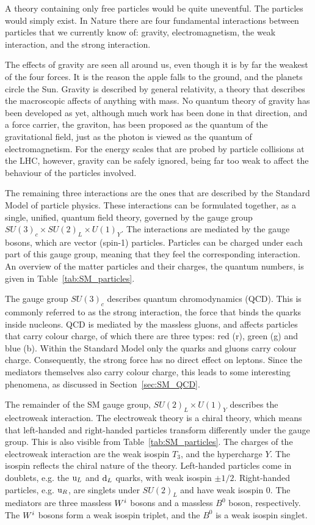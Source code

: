 A theory containing only free particles would be quite uneventful. The particles would simply
exist.
In Nature there are four fundamental interactions between particles that we currently know of:
gravity, electromagnetism, the weak interaction, and the strong interaction. 

The effects of gravity are seen all around us, even though it is by far the weakest of the four
forces. It is the reason the apple falls to the ground, and the planets circle the Sun. 
Gravity is described by general relativity, a theory that describes the macroscopic affects of
anything with mass. No quantum theory of gravity has been developed as yet, although much work
has been done in that direction, and a force carrier, the graviton, has been proposed as the quantum
of the gravitational field, just as the photon is viewed as the quantum of electromagnetism.
For the energy scales that are probed by particle collisions at the LHC, however, gravity can be
safely ignored, being far too weak to affect the behaviour of the particles involved. 

The remaining three interactions are the ones that are described by the Standard Model of
particle physics. These interactions can be formulated together, as a single, unified, quantum field
theory,
governed by the gauge group $SU(3)_c \times SU(2)_L \times U(1)_Y$. The interactions are mediated by
the gauge bosons, which are vector (spin-1) particles. Particles can be charged under each part of
this gauge group, meaning that they feel the corresponding interaction. An overview of the matter 
particles and their charges, the quantum numbers, is given in Table~\ref{tab:SM_particles}. 

The gauge group $SU(3)_c$ describes quantum chromodynamics (QCD). This is commonly referred to as
the strong interaction, the force that binds the quarks inside nucleons. QCD is mediated by the
massless gluons, and affects particles that carry colour charge, of which there are three types:
red (r), green (g) and blue (b). Within the Standard Model only the quarks and gluons carry colour
charge. Consequently, the strong force has no direct effect on leptons. 
Since the mediators themselves also carry colour charge, this leads to some interesting phenomena,
as discussed in Section~\ref{sec:SM_QCD}. 

The remainder of the SM gauge group, $SU(2)_L \times U(1)_Y$ describes the electroweak interaction. 
The electroweak theory is a chiral theory, which means that left-handed and right-handed particles
transform differently under the gauge group. This is also visible from
Table~\ref{tab:SM_particles}.
The charges of the electroweak interaction are the weak isospin $T_3$, and the hypercharge $Y$. 
The isospin reflects the chiral nature of the theory. Left-handed particles come in doublets, e.g.
the $\mathrm{u}_L$ and $\mathrm{d}_L$ quarks, with weak isospin $\pm 1/2$. Right-handed particles, e.g.
$\mathrm{u}_R$, are singlets under $SU(2)_L$ and have weak isospin 0. 
The mediators are three massless $W^i$ bosons and a massless $B^0$ boson, respectively. The $W^i$
bosons form a weak isospin triplet, and the $B^0$ is a weak isospin singlet. 


